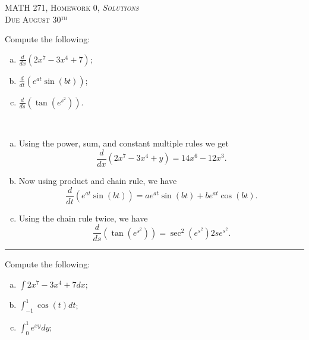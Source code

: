 \documentclass[12pt]{article} %
\begin{document}
\begin{center}
   \textsc{\large MATH 271, Homework 0, \emph{Solutions}}\\
   \textsc{Due August 30$^\textrm{th}$}
\end{center}


\begin{problem}
    Compute the following:
\begin{enumerate}[(a)]
    \item $\displaystyle{\frac{d}{dx}(2x^7-3x^4+7)}$;
    \item $\displaystyle{\frac{d}{dt}\left(e^{at}\sin(bt)\right)}$;
    \item $\displaystyle{\frac{d}{ds}\left(\tan\left( e^{s^2}\right)\right)}$.
\end{enumerate}
\end{problem}

\begin{solution}~
\begin{enumerate}[(a)]
    \item Using the power, sum, and constant multiple rules we get
    \[
    \frac{d}{dx}\left( 2x^7 -3x^4 +y\right) = 14x^6-12x^3.
    \]
    \item Now using product and chain rule, we have
    \[
    \frac{d}{dt}\left( e^{at}\sin(bt)\right)= ae^{at}\sin(bt)+be^{at}\cos(bt).
    \]
    \item Using the chain rule twice, we have
    \[
    \frac{d}{ds} \left( \tan\left( e^{s^2}\right)\right) = \sec^2\left(e^{s^2}\right)2se^{s^2}.
    \]
\end{enumerate}
\end{solution}

\hrule

\begin{problem}
    Compute the following:
\begin{enumerate}[(a)]
    \item $\displaystyle{\int 2x^7-3x^4+7dx}$;
    \item $\displaystyle{\int_{-1}^1 \cos(t) dt}$;
    \item $\displaystyle{\int_0^1 e^{xy}dy}$;
\end{enumerate}
\end{problem}
\end{document}
